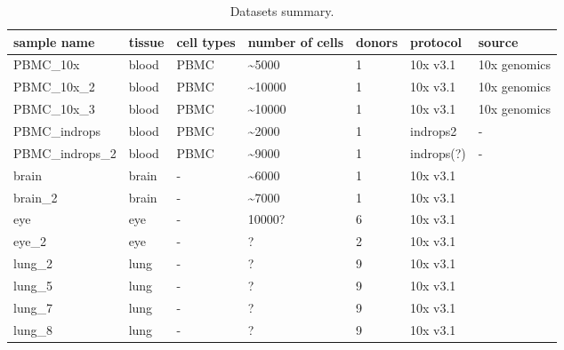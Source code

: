 \begin{table}[htbp]
  \centering
  \begin{tabular}{l|llllll}
    \toprule
    sample name & tissue & cell types & number of cells & donors & protocol & source \\
    \midrule
    PBMC\_10x & blood & PBMC & \textasciitilde 5000 & 1 & 10x v3.1 & 10x genomics \\
    PBMC\_10x\_2 & blood & PBMC & \textasciitilde 10000 & 1 & 10x v3.1 & 10x genomics \\
    PBMC\_10x\_3 & blood & PBMC & \textasciitilde 10000 & 1 & 10x v3.1 & 10x genomics \\
    PBMC\_indrops & blood & PBMC & \textasciitilde 2000 & 1 & indrops2 & - \\
    PBMC\_indrops_2 & blood & PBMC & \textasciitilde 9000 & 1 & indrops(?) & - \\
    brain & brain & - & \textasciitilde 6000 & 1 & 10x v3.1 & \cite{Siletti2023} \\
    brain\_2 & brain & - & \textasciitilde 7000 & 1 & 10x v3.1 & \cite{Siletti2023} \\
    eye & eye & - & 10000? & 6 & 10x v3.1 & \cite{Menon2019} \\
    eye\_2 & eye & - & ? & 2 & 10x v3.1 & \cite{Voigt2019} \\
    lung\_2 & lung & - & ? & 9 & 10x v3.1 & \cite{Mould2021} \\
    lung\_5 & lung & - & ? & 9 & 10x v3.1 & \cite{Mould2021} \\
    lung\_7 & lung & - & ? & 9 & 10x v3.1 & \cite{Mould2021} \\
    lung\_8 & lung & - & ? & 9 & 10x v3.1 & \cite{Mould2021} \\
    \bottomrule
  \end{tabular}
  \caption{Datasets summary.}
  \label{tab:datasets}
\end{table}
